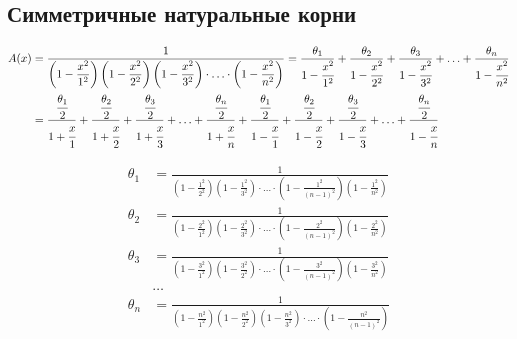 
\subsection{Симметричные натуральные корни}

\begin{equation*} \begin{aligned}
A(x) &=
\frac{1}
{
  \left(1 - \displaystyle \frac{x^2}{1^2} \right)
  \left(1 - \displaystyle \frac{x^2}{2^2} \right)
  \left(1 - \displaystyle \frac{x^2}{3^2} \right)
  \cdot \ldots \cdot
  \left(1 - \displaystyle \frac{x^2}{n^2} \right)
}
= \frac{\theta_1}{1 - \cfrac{x^2}{1^2}}
+ \frac{\theta_2}{1 - \cfrac{x^2}{2^2}}
+ \frac{\theta_3}{1 - \cfrac{x^2}{3^2}}
+ \ldots
+ \frac{\theta_n}{1 - \cfrac{x^2}{n^2}} \\ &
= \frac{\cfrac{\theta_1}{2}}{1 + \cfrac{x}{1}}
+ \frac{\cfrac{\theta_2}{2}}{1 + \cfrac{x}{2}}
+ \frac{\cfrac{\theta_3}{2}}{1 + \cfrac{x}{3}}
+ \ldots
+ \frac{\cfrac{\theta_n}{2}}{1 + \cfrac{x}{n}}
+ \frac{\cfrac{\theta_1}{2}}{1 - \cfrac{x}{1}}
+ \frac{\cfrac{\theta_2}{2}}{1 - \cfrac{x}{2}}
+ \frac{\cfrac{\theta_3}{2}}{1 - \cfrac{x}{3}}
+ \ldots
+ \frac{\cfrac{\theta_n}{2}}{1 - \cfrac{x}{n}} \\
\end{aligned} \end{equation*}

\begin{equation*} \begin{aligned}
\theta_1 &= \frac{1}
{
  \left(1 - \displaystyle \frac{1^2}{2^2} \right)
  \left(1 - \displaystyle \frac{1^2}{3^2} \right)
  \cdot \ldots \cdot
  \left(1 - \displaystyle \frac{1^2}{(n - 1)^2} \right)
  \left(1 - \displaystyle \frac{1^2}{n^2} \right)
} \\
\theta_2 &= \frac{1}
{
  \left(1 - \displaystyle \frac{2^2}{1^2} \right)
  \left(1 - \displaystyle \frac{2^2}{3^2} \right)
  \cdot \ldots \cdot
  \left(1 - \displaystyle \frac{2^2}{(n - 1)^2} \right)
  \left(1 - \displaystyle \frac{2^2}{n^2} \right)
} \\
\theta_3 &= \frac{1}
{
  \left(1 - \displaystyle \frac{3^2}{1^2} \right)
  \left(1 - \displaystyle \frac{3^2}{2^2} \right)
  \cdot \ldots \cdot
  \left(1 - \displaystyle \frac{3^2}{(n - 1)^2} \right)
  \left(1 - \displaystyle \frac{3^2}{n^2} \right)
} \\
&\ldots \\
\theta_n &= \frac{1}
{
  \left(1 - \displaystyle \frac{n^2}{1^2} \right)
  \left(1 - \displaystyle \frac{n^2}{2^2} \right)
  \left(1 - \displaystyle \frac{n^2}{3^2} \right)
  \cdot \ldots \cdot
  \left(1 - \displaystyle \frac{n^2}{(n - 1)^2} \right)
} \\
\end{aligned} \end{equation*}

